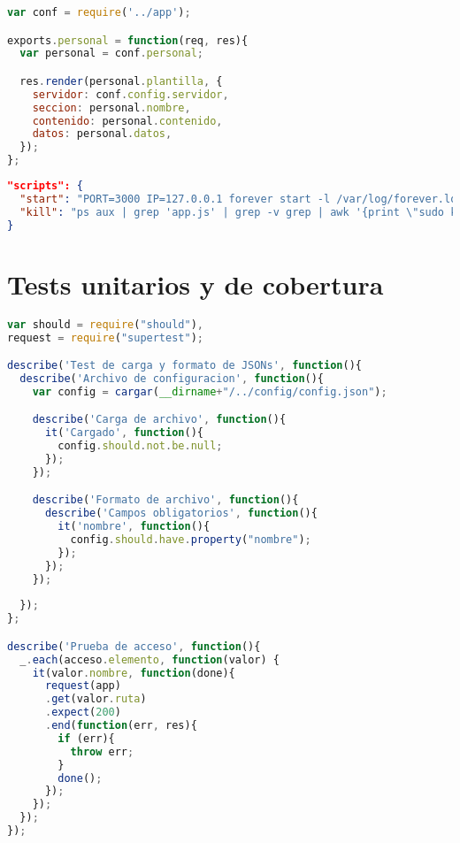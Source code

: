 \begin{lstlisting}[language=javascript,caption={Archivo {\tt administracion.js}},label={lst:adminjs}]
var conf = require('../app');

exports.personal = function(req, res){
  var personal = conf.personal;

  res.render(personal.plantilla, {
    servidor: conf.config.servidor,
    seccion: personal.nombre,
    contenido: personal.contenido,
    datos: personal.datos,
  });
};
\end{lstlisting}

\begin{lstlisting}[language=json,caption={Scripts de inicio y detención},label={lst:ini_para}]
"scripts": {
  "start": "PORT=3000 IP=127.0.0.1 forever start -l /var/log/forever.log -a -o /var/log/out.log -e /var/log/err.log ./app.js",
  "kill": "ps aux | grep 'app.js' | grep -v grep | awk '{print \"sudo kill -9 \" $2}' | sh"
}
\end{lstlisting}

\section{Tests unitarios y de cobertura}

\begin{lstlisting}[language=javascript,caption={Archivo {\tt test.js}},label={lst:testjs}]
var should = require("should"),
request = require("supertest");

describe('Test de carga y formato de JSONs', function(){
  describe('Archivo de configuracion', function(){
    var config = cargar(__dirname+"/../config/config.json");

    describe('Carga de archivo', function(){
      it('Cargado', function(){
        config.should.not.be.null;
      });
    });

    describe('Formato de archivo', function(){
      describe('Campos obligatorios', function(){
        it('nombre', function(){
          config.should.have.property("nombre");
        });
      });
    });
    
  });
};

describe('Prueba de acceso', function(){
  _.each(acceso.elemento, function(valor) {
    it(valor.nombre, function(done){
      request(app)
      .get(valor.ruta)
      .expect(200)
      .end(function(err, res){
        if (err){
          throw err;
        }
        done();
      });
    });
  });
});
\end{lstlisting}

